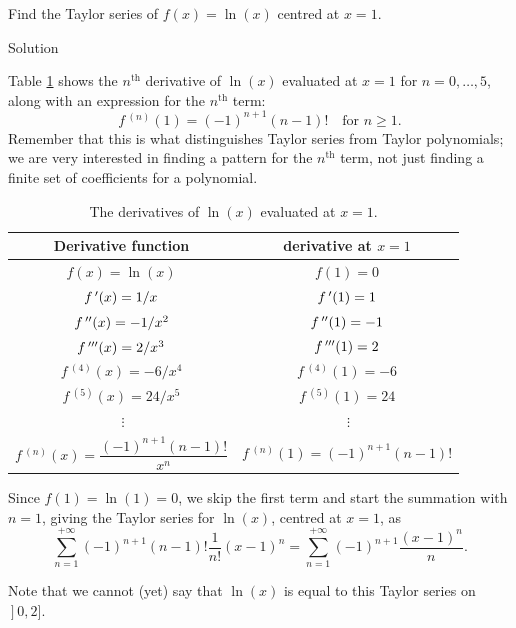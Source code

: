 \begin{example}\label{ex_ts2}
Find the Taylor series of $f(x) = \ln(x)$ centred at $x=1$.

Solution 

Table \ref{tab_series_5} shows the $n^\text{th}$ derivative of $\ln(x)$ evaluated at $x=1$ for $n=0,\ldots,5$, along with an expression for the $n^\text{th}$ term: $$f\,^{(n)}(1) = (-1)^{n+1}(n-1)!\quad \text{for $n\geq 1$.}$$ Remember that this is what distinguishes Taylor series from Taylor polynomials; we are very interested in finding a pattern for the $n^\text{th}$ term, not just finding a finite set of coefficients for a polynomial.

\begin{table}[H]
\caption{The derivatives of $\ln(x)$ evaluated at $x=1$.}
\label{tab_series_5}
\renewcommand{\arraystretch}{1.5}
\begin{tabular}{c|c}
Derivative function&derivative at $x=1$\\\hline
$f(x) = \ln(x) $&$f(1) = 0$\\
$f\,'(x) = 1/x $&$f\,'(1) = 1$\\
$f\,''(x) = -1/x^2 $&$f\,''(1) = -1$\\
$f\,'''(x) = 2/x^3 $&$f\,'''(1) = 2$\\
$f\,^{(4)}(x) = -6/x^4 $&$f\,^{(4)}(1) = -6$\\
$f\,^{(5)}(x) = 24/x^5 $&$f\,^{(5)}(1) = 24$\\
$\ \vdots $& $\ \vdots$\\
$f\,^{(n)}(x) =\dfrac{(-1)^{n+1}(n-1)!}{x^n} $ & $f\,^{(n)}(1) = (-1)^{n+1}(n-1)!$\\
\end{tabular}
\renewcommand{\arraystretch}{1}
\end{table}


Since $f(1) = \ln(1) = 0$, we skip the first term and start the summation with $n=1$, giving the Taylor series for $\ln(x)$, centred at $x=1$, as 
$$\sum_{n=1}^{+\infty} (-1)^{n+1}(n-1)!\frac{1}{n!}(x-1)^n = \sum_{n=1}^{+\infty} (-1)^{n+1}\frac{(x-1)^n}{n}. $$

Note that we cannot (yet) say that $\ln (x)$ is equal to this Taylor series on $\left.\right]0,2]$.
\end{example}

